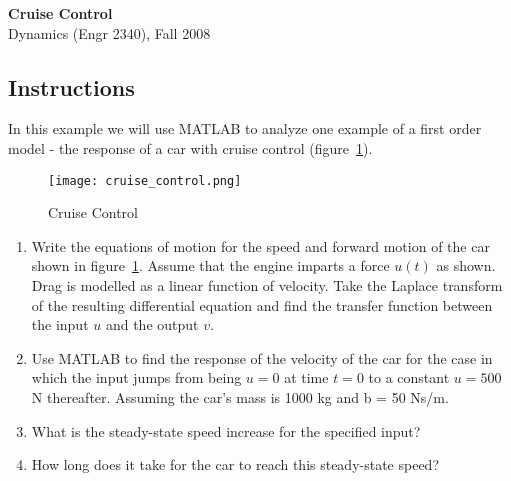 \documentclass[10pt]{article}
\begin{document}
\begin{center}
{\Large {\bf Cruise Control}} \\
{\large {Dynamics (Engr 2340), Fall 2008}} 
\end{center}

\subsection*{Instructions}
In this example we will use MATLAB to analyze one example of a first order model - the response of a car with cruise control (figure~\ref{f:msd}).

\begin{figure}[htb!]
\centerline{
{\texttt{[image: cruise\_control.png]}}}
\caption{Cruise Control}
\label{f:msd}
\end{figure}


\begin{enumerate}
\item Write the equations of motion for the speed and forward motion of the car shown in figure~\ref{f:msd}.  Assume that the engine imparts a force $u(t)$ as shown.  Drag is modelled as a linear function of velocity.  Take the Laplace transform of the resulting differential equation and find the transfer function between the input $u$ and the output $v$.

\item Use MATLAB to find the response of the velocity of the car for the case in which the input jumps from being $u=0$ at time $t=0$ to a constant $u=500$ N thereafter.  Assuming the car's mass is 1000 kg and b = 50 Ns/m.
\item What is the steady-state speed increase for the specified input?
\item How long does it take for the car to reach this steady-state speed?
\end{enumerate}
\end{document}
